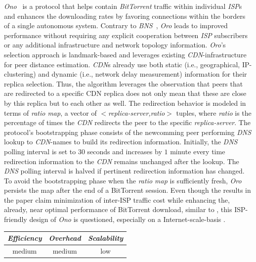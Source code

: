 \emph{Ono}~\cite{CB2008} is a protocol that helps contain
{\sl BitTorrent} traffic within individual \emph{ISP}s
and enhances the downloading rates by favoring connections
within the borders of a single autonomous system. Contrary to
\emph{BNS}~\cite{BCCMSBZ2006},
\emph{Oro} leads to improved performance 
without requiring any explicit cooperation between 
\emph{ISP} subscribers or any additional
infrastructure and network topology information.
\emph{Oro}'s selection approach is 
landmark-based and leverages existing {\sl CDN}-infrastructure 
for peer distance estimation. {\sl CDN}s already use both static (i.e.,
geographical, IP-clustering) and dynamic (i.e., network delay measurement)
information for their replica selection. Thus, the algorithm leverages the
observation that peers that are redirected to a specific CDN replica does not
only mean that these are close by this replica but to each other as well.
The redirection behavior is modeled in terms of \emph{ratio map}, 
a vector of \emph{$<$replica-server,ratio$>$} tuples, where \emph{ratio} is
the percentage of times the {\sl CDN} redirects the peer 
to the specific \emph{replica-server}.
The protocol's bootstrapping phase consists of the newcomming peer performing
{\sl DNS} lookup to {\sl CDN}-names to build its redirection information.
Initially, the {\sl DNS} polling interval is set to $30$ seconds 
and increases by $1$ minute every time redirection information 
to the {\sl CDN} remains unchanged after the lookup.
The {\sl DNS} polling interval is halved if pertinent 
redirection information has changed.
To avoid the bootstrapping phase when the \emph{ratio map} 
is sufficiently fresh, 
\emph{Oro} persists the map after the end of a BitTorrent session.
Even though the results in the paper claim minimization of inter-ISP traffic
cost while enhancing the, already, near optimal performance of BitTorrent
download, similar to \cite{BCCMSBZ2006}, this ISP-friendly design of \emph{Ono}
is questioned, especially on a Internet-scale-basis \cite{PMJKA2009,LCLX2009,CLYSR2011}.
\begin{center}
{\footnotesize
\begin{tabular}{ccc}
\emph{Efficiency} & \emph{Overhead} & \emph{Scalability} \\
\hline
medium &
medium &
low
\end{tabular}
}
\end{center}

